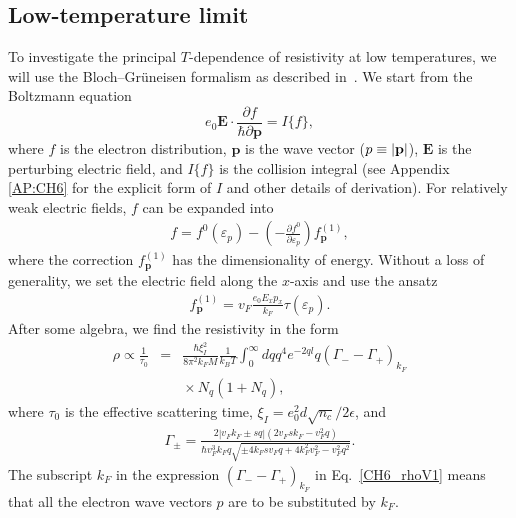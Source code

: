 \subsection{Low-temperature limit}\label{sec:low}
To investigate the principal $T$-dependence of resistivity at low temperatures, we will use the Bloch--Gr\"uneisen formalism as described in~\cite{Ziman:2001aa, Zaitsev:2014aa}.
We start from the Boltzmann equation
%
\begin{equation}\label{CH6_1}
e_0\textbf{E}\cdot\frac{\partial f}{\hbar\partial \textbf{p}}=I\{f\},
\end{equation}
%
where $f$ is the electron distribution, $\mathbf{p}$ is the wave vector ($p\equiv\abs{\mathbf{p}}$), $\mathbf{E}$ is the perturbing electric field, and $I\{f\}$ is the collision integral (see Appendix \ref{AP:CH6} for the explicit form of $I$ and other details of derivation).
%
For relatively weak electric fields, $f$ can be expanded into
%
\begin{eqnarray}\label{CH6_f}
f=f^0(\varepsilon_p)-\left(-\frac{\partial f^0}{\partial\varepsilon_p}\right)f^{(1)}_\textbf{p},
\end{eqnarray}
%
where the correction $f^{(1)}_\textbf{p}$ has the dimensionality of energy.
Without a loss of generality, we set the electric field along the $x$-axis and use the ansatz
%
\begin{eqnarray}\label{CH6_fp}
f^{(1)}_\textbf{p}= v_F\frac{e_0E_xp_x}{k_F}\tau(\varepsilon_p).
\end{eqnarray}
%
After some algebra, we find the resistivity in the form
%
\begin{eqnarray}
\label{CH6_rhoV1}
\rho\propto\frac{1}{\tau_0}&=&\frac{\hbar\xi_I^2}{8\pi^2k_FM}\frac{1}{k_BT}\int_0^\infty dq q^4e^{-2ql}q(\Gamma_--\Gamma_+)_{k_F}\nonumber\\
&{}&{}\times N_q(1+N_q),
\end{eqnarray}
%
where $\tau_0$ is the effective scattering time, $\xi_I= e_0^2d\sqrt{n_c}/2\epsilon$, and
%
\begin{eqnarray}
\label{CH6_gamma2}
\Gamma_\pm=\frac{2|v_Fk_F\pm sq|(2v_Fsk_F-v_F^2q)}{\hbar v_F^3k_F q\sqrt{\pm 4k_Fsv_Fq+4k_F^2v_F^2-v_F^2q^2}}.
\end{eqnarray}
%
The subscript $k_F$ in the expression $(\Gamma_--\Gamma_+)_{k_F}$ in Eq.~\eqref{CH6_rhoV1} means that all the electron wave vectors $p$ are to be substituted by $k_F$.


